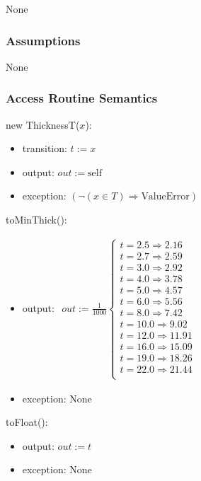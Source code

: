 \documentclass[12pt, titlepage]{article}
\begin{document}
None

\subsubsection {Assumptions}

None

\subsubsection {Access Routine Semantics}

\noindent new ThicknessT($x$):
\begin{itemize}
\item transition: $t := x$
\item output: $out := \mbox{self}$
\item exception: $(\neg (x \in T) \Rightarrow \mbox{ValueError})$
\end{itemize}

\noindent toMinThick():
\begin{itemize}
\item output: $\begin{array}{rcrc}
out := \frac{1}{1000}
\begin{cases}
t = 2.5 \Rightarrow 2.16 &\\ 
t = 2.7 \Rightarrow 2.59 &\\
t = 3.0 \Rightarrow 2.92 &\\
t = 4.0 \Rightarrow 3.78 &\\
t = 5.0 \Rightarrow 4.57 &\\
t = 6.0 \Rightarrow 5.56 &\\
t = 8.0 \Rightarrow 7.42 &\\ 
t = 10.0 \Rightarrow 9.02 &\\
t = 12.0 \Rightarrow 11.91 &\\ 
t = 16.0 \Rightarrow 15.09 &\\
t = 19.0 \Rightarrow 18.26 &\\ 
t = 22.0 \Rightarrow 21.44 &\\
\end{cases}
    \end{array}$
\item exception: None
\end{itemize}

\noindent toFloat():
\begin{itemize}
\item output: $out := t$
\item exception: None
\end{itemize}
\end{document}
